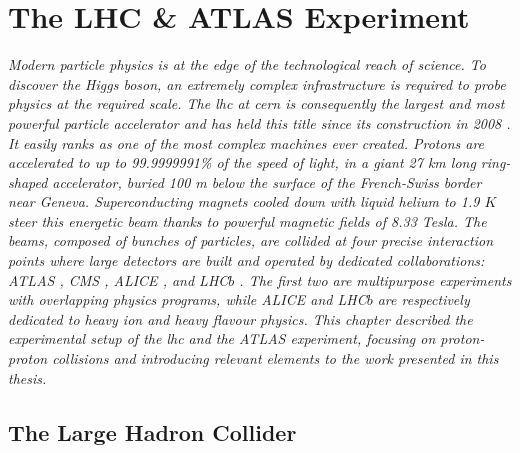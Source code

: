 \chapter{\color{oxfordblue} The LHC \& ATLAS Experiment}\label{chapter-ATLAS}
\ChapFrame

\textit{
Modern particle physics is at the edge of the technological reach of science. To discover the Higgs boson, an extremely complex infrastructure is required to probe physics at the required scale. The \gls{lhc} at \gls{cern} is consequently the largest and most powerful particle accelerator and has held this title since its construction in 2008 \cite{LyndonEvans_2008}. It easily ranks as one of the most complex machines ever created. Protons are accelerated to up to 99.9999991\% of the speed of light, in a giant 27 km long ring-shaped accelerator, buried 100 m below the surface of the French-Swiss border near Geneva. Superconducting magnets cooled down with liquid helium to 1.9 $K$ steer this energetic beam thanks to powerful magnetic fields of 8.33 Tesla. The beams, composed of bunches of particles, are collided at four precise interaction points where large detectors are built and operated by dedicated collaborations: ATLAS \cite{TheATLASCollaboration_2008}, CMS \cite{TheCMSCollaboration_2008}, ALICE \cite{TheALICECollaboration_2008}, and LHC$b$ \cite{TheLHCbCollaboration_2008}. The first two are multipurpose experiments with overlapping physics programs, while ALICE and LHC$b$ are respectively dedicated to heavy ion and heavy flavour physics. This chapter described the experimental setup of the \gls{lhc} and the ATLAS experiment, focusing on proton-proton collisions and introducing relevant elements to the work presented in this thesis.} 

\section{The Large Hadron Collider}\label{sec-LHC} %

